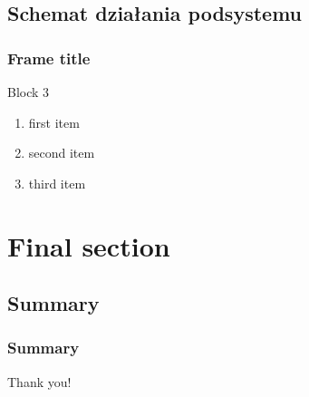 \documentclass{beamer}
\begin{document}
\subsection{Schemat działania podsystemu}

\begin{frame}
\frametitle{Frame title}
\fboxsep=0pt
\hfill

\begin{minipage}[t]{0.48\linewidth}
\begin{block}{Block 3}
\begin{enumerate}
\item first item
\item second item
\item third item
\end{enumerate}
\end{block}
\end{minipage}


\end{frame}



\section{Final section}

\subsection{Summary}
\begin{frame}
\frametitle{Summary}
\centerline{Thank you!}
\end{frame}

\end{document}
